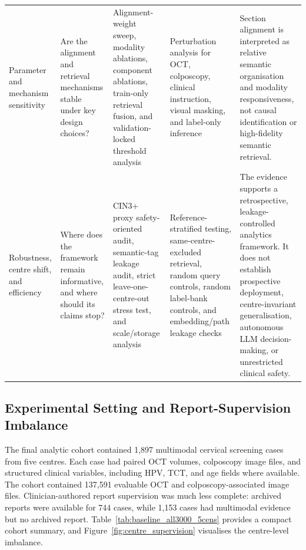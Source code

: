 \documentclass[11pt, a4paper]{article}
\theoremstyle{plain}
\theoremstyle{definition}
\begin{document}
\begin{landscape}
\begin{table}[p]
\begin{threeparttable}
{\begin{tabular}{p{3.0cm}p{4.8cm}p{5.8cm}p{5.8cm}p{5.4cm}}
    \addlinespace[2pt]
    Parameter and mechanism sensitivity
    & Are the alignment and retrieval mechanisms stable under key design choices?
    & Alignment-weight sweep, modality ablations, component ablations, train-only retrieval fusion, and validation-locked threshold analysis
    & Perturbation analysis for OCT, colposcopy, clinical instruction, visual masking, and label-only inference
    & Section alignment is interpreted as relative semantic organisation and modality responsiveness, not causal identification or high-fidelity semantic retrieval. \\
    \addlinespace[2pt]
    Robustness, centre shift, and efficiency
    & Where does the framework remain informative, and where should its claims stop?
    & CIN3+ proxy safety-oriented audit, semantic-tag leakage audit, strict leave-one-centre-out stress test, and scale/storage analysis
    & Reference-stratified testing, same-centre-excluded retrieval, random query controls, random label-bank controls, and embedding/path leakage checks
    & The evidence supports a retrospective, leakage-controlled analytics framework. It does not establish prospective deployment, centre-invariant generalisation, autonomous LLM decision-making, or unrestricted clinical safety. \\
    \bottomrule
  \end{tabular}%
  }
  \end{threeparttable}
\end{table}
\end{landscape}
\clearpage

\FloatBarrier

\subsection{Experimental Setting and Report-Supervision Imbalance}
\label{subsec:cohort_results}

The final analytic cohort contained 1,897 multimodal cervical screening cases from five centres. Each case had paired OCT volumes, colposcopy image files, and structured clinical variables, including HPV, TCT, and age fields where available. The cohort contained 137,591 evaluable OCT and colposcopy-associated image files. Clinician-authored report supervision was much less complete: archived reports were available for 744 cases, while 1,153 cases had multimodal evidence but no archived report. Table~\ref{tab:baseline_all3000_5cens} provides a compact cohort summary, and Figure~\ref{fig:centre_supervision} visualises the centre-level imbalance.
\end{document}
